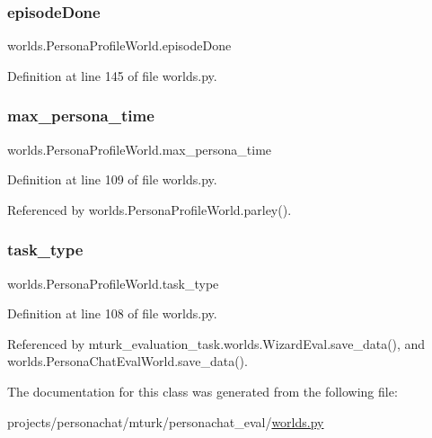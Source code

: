 \subsubsection{\texorpdfstring{episode\+Done}{episodeDone}}
{\footnotesize\ttfamily worlds.\+Persona\+Profile\+World.\+episode\+Done}



Definition at line 145 of file worlds.\+py.

\mbox{\label{classworlds_1_1PersonaProfileWorld_abd185a8e8d25f69d13f403061f4ffbd6}} 
\subsubsection{\texorpdfstring{max\+\_\+persona\+\_\+time}{max\_persona\_time}}
{\footnotesize\ttfamily worlds.\+Persona\+Profile\+World.\+max\+\_\+persona\+\_\+time}



Definition at line 109 of file worlds.\+py.



Referenced by worlds.\+Persona\+Profile\+World.\+parley().

\mbox{\label{classworlds_1_1PersonaProfileWorld_a09c94765229b11167b8691ae79e2d397}} 
\subsubsection{\texorpdfstring{task\+\_\+type}{task\_type}}
{\footnotesize\ttfamily worlds.\+Persona\+Profile\+World.\+task\+\_\+type}



Definition at line 108 of file worlds.\+py.



Referenced by mturk\+\_\+evaluation\+\_\+task.\+worlds.\+Wizard\+Eval.\+save\+\_\+data(), and worlds.\+Persona\+Chat\+Eval\+World.\+save\+\_\+data().



The documentation for this class was generated from the following file\+:\begin{DoxyCompactItemize}
\item 
projects/personachat/mturk/personachat\+\_\+eval/\hyperlink{projects_2personachat_2mturk_2personachat__eval_2worlds_8py}{worlds.\+py}\end{DoxyCompactItemize}
